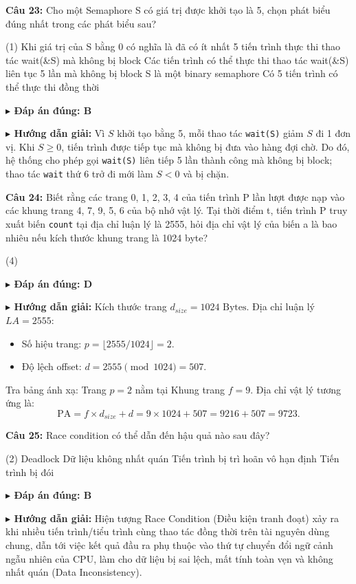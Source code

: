 \documentclass[11pt,a4paper]{article}
\newcommand{\giaithich}[2]{%
    \par\vspace{0.15cm}\noindent
    \begingroup\small
    \noindent\textbf{\color{blue}$\blacktriangleright$ Đáp án đúng: #1} \par\vspace{0.08cm}
    \noindent\textbf{\color{teal}$\blacktriangleright$ Hướng dẫn giải:} #2
    \endgroup\par\vspace{0.35cm}
}
\begin{document}
\noindent\textbf{Câu 23:} Cho một Semaphore S có giá trị được khởi tạo là 5, chọn phát biểu đúng nhất trong các phát biểu sau?
\begin{tasks}(1)
    \task Khi giá trị của S bằng 0 có nghĩa là đã có ít nhất 5 tiến trình thực thi thao tác wait(\&S) mà không bị block
    \task Các tiến trình có thể thực thi thao tác wait(\&S) liên tục 5 lần mà không bị block
    \task S là một binary semaphore
    \task Có 5 tiến trình có thể thực thi đồng thời
\end{tasks}
\giaithich{B}{Vì $S$ khởi tạo bằng 5, mỗi thao tác \texttt{wait(S)} giảm $S$ đi 1 đơn vị. Khi $S \ge 0$, tiến trình được tiếp tục mà không bị đưa vào hàng đợi chờ. Do đó, hệ thống cho phép gọi \texttt{wait(S)} liên tiếp 5 lần thành công mà không bị block; thao tác \texttt{wait} thứ 6 trở đi mới làm $S < 0$ và bị chặn.}

\noindent\textbf{Câu 24:} Biết rằng các trang 0, 1, 2, 3, 4 của tiến trình P lần lượt được nạp vào các khung trang 4, 7, 9, 5, 6 của bộ nhớ vật lý. Tại thời điểm t, tiến trình P truy xuất biến \texttt{count} tại địa chỉ luận lý là 2555, hỏi địa chỉ vật lý của biến a là bao nhiêu nếu kích thước khung trang là 1024 byte?
\begin{tasks}(4)
\end{tasks}
\giaithich{D}{Kích thước trang $d_{size} = 1024\text{ Bytes}$. Địa chỉ luận lý $LA = 2555$:
\begin{itemize}[noitemsep,topsep=1pt]
    \item Số hiệu trang: $p = \lfloor 2555 / 1024 \rfloor = 2$.
    \item Độ lệch offset: $d = 2555 \pmod{1024} = 507$.
\end{itemize}
Tra bảng ánh xạ: Trang $p = 2$ nằm tại Khung trang $f = 9$.
Địa chỉ vật lý tương ứng là:
$$\text{PA} = f \times d_{size} + d = 9 \times 1024 + 507 = 9216 + 507 = 9723.$$}

\noindent\textbf{Câu 25:} Race condition có thể dẫn đến hậu quả nào sau đây?
\begin{tasks}(2)
    \task Deadlock
    \task Dữ liệu không nhất quán
    \task Tiến trình bị trì hoãn vô hạn định
    \task Tiến trình bị đói
\end{tasks}
\giaithich{B}{Hiện tượng Race Condition (Điều kiện tranh đoạt) xảy ra khi nhiều tiến trình/tiểu trình cùng thao tác đồng thời trên tài nguyên dùng chung, dẫn tới việc kết quả đầu ra phụ thuộc vào thứ tự chuyển đổi ngữ cảnh ngẫu nhiên của CPU, làm cho dữ liệu bị sai lệch, mất tính toàn vẹn và không nhất quán (Data Inconsistency).}
\end{document}
